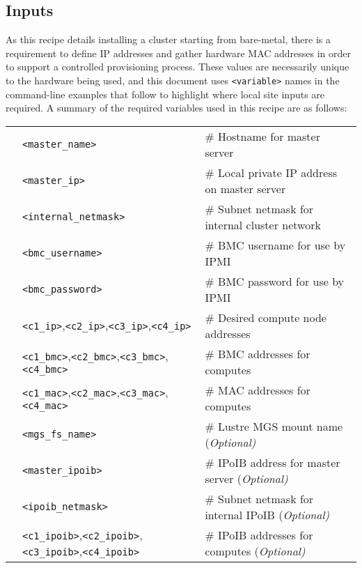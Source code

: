 \subsection{Inputs}
As this recipe details installing a cluster
starting from bare-metal, there is a requirement to define IP addresses and gather
hardware MAC addresses in order to support a controlled provisioning process. These values
are necessarily unique to the hardware being used, and this document uses \texttt{<variable>}
names in the command-line examples that follow to highlight where local site
inputs are required. A summary of the required variables used in this recipe
are as follows: \\

\vspace*{0.2cm}
\begin{tabular}{@{}>{\textbullet}cll@{}}
& \texttt{<master\_name>}  & {\small \# Hostname for master server} \\
& \texttt{<master\_ip>} & {\small \# Local private IP address on master server} \\
& \texttt{<internal\_netmask>} & {\small \# Subnet netmask for internal cluster network} \\
& \texttt{<bmc\_username>} & {\small \# BMC username for use by IPMI} \\
& \texttt{<bmc\_password>} & {\small \# BMC password for use by IPMI} \\
& \texttt{<c1\_ip>},\texttt{<c2\_ip>},\texttt{<c3\_ip>},\texttt{<c4\_ip>}
& {\small \# Desired compute node addresses} \\
& \texttt{<c1\_bmc>},\texttt{<c2\_bmc>},\texttt{<c3\_bmc>},\texttt{<c4\_bmc>}
& {\small \# BMC addresses for computes} \\
& \texttt{<c1\_mac>},\texttt{<c2\_mac>},\texttt{<c3\_mac>},\texttt{<c4\_mac>}
& {\small \# MAC addresses for computes} \\
& \texttt{<mgs\_fs\_name>} & {\small \# Lustre MGS mount name (\em Optional)} \\
& \texttt{<master\_ipoib>} & {\small \# IPoIB address for master server (\em Optional)} \\
& \texttt{<ipoib\_netmask>} & {\small \# Subnet netmask for internal IPoIB (\em Optional)} \\
& \texttt{<c1\_ipoib>},\texttt{<c2\_ipoib>},\texttt{<c3\_ipoib>},\texttt{<c4\_ipoib>}
& {\small \# IPoIB addresses for computes (\em Optional)}\\

\end{tabular}
